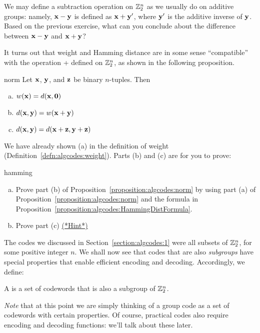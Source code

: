 \begin{exercise}{}
We may define a subtraction operation on ${\Bbb Z}_2^n$ as we usually do on additive groups: namely, ${\bold x} - {\bold y}$ is defined as ${\bold x} + {\bold y'}$, where ${\bold y'}$ is the additive inverse of ${\bold y}$.  Based on the previous exercise, what can you conclude about the difference between ${\bold x} - {\bold y}$ and ${\bold x} + {\bold y}$?
\end{exercise} 
  
It turns out that  weight and Hamming distance are in some sense ``compatible'' with the operation + defined on ${\Bbb Z}_2^n$, as shown in the following proposition.

\begin{prop}{norm}
Let ${\bold x}$, ${\bold y}$, and ${\bold z}$ be binary $n$-tuples. Then
\begin{enumerate}[(a)]
\item
$w({\bold x}) = d({\bold x},{\bold 0})$
\item
$d({\bold x},{\bold y}) = w({\bold x}+{\bold y})$
\item
$d({\bold x},{\bold y}) = d({\bold x}+{\bold z},{\bold y}+{\bold z})$
\end{enumerate}
\end{prop}
We have already shown (a) in the definition of weight (Definition~\ref{defn:algcodes:weight}).
Parts (b) and (c) are for you to prove:

\begin{exercise}{hamming}
\begin{enumerate}[(a)]
\item
Prove part (b) of Proposition~\ref{proposition:algcodes:norm} by using part (a) of Proposition~\ref{proposition:algcodes:norm} and the formula in Proposition~\ref{proposition:algcodes:HammingDistFormula}.
\item Prove part (c) \hyperref[sec:algcodes:hints]{(*Hint*)} 
\end{enumerate}
\end{exercise}
The codes we discussed in Section~\ref{section:algcodes:1} were all subsets of ${\Bbb Z}_2^n$, for some positive integer $n$. We shall now see that codes that are also \emph{subgroups} have special properties that enable efficient encoding and decoding. Accordingly, we define:

\begin{defn}
 A  is a set of codewords that is also a subgroup of ${\Bbb
Z}_2^n$.  
 \end{defn}
\emph{Note} that at this point we are simply thinking of a group code as a set of codewords with certain properties. Of course, practical codes also require  encoding and decoding functions: we'll talk about these later.
 
